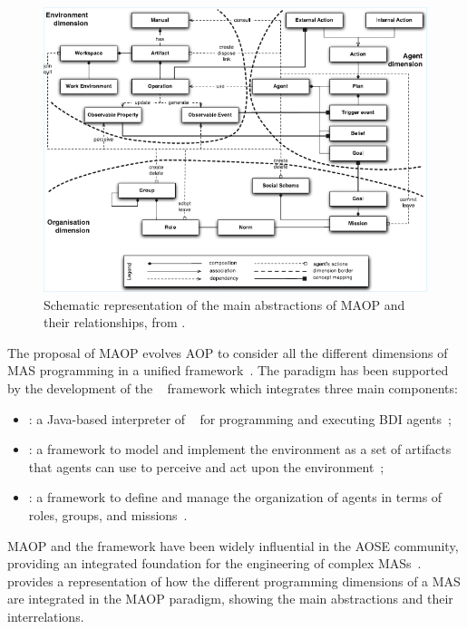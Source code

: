 \begin{figure}[t]
    \centering
    \includegraphics[width=\textwidth]{figures/mas-dimensions-schema.pdf}
    \caption{Schematic representation of the main abstractions of \ac{MAOP} and their relationships, from \cite{Boissier_Bordini_Hübner_Ricci_Santi_2013}.}
    \label{fig:mas-dimensions-schema}
\end{figure}

The proposal of \ac{MAOP} evolves \ac{AOP} to consider all the different dimensions of \ac{MAS} programming in a unified framework~\cite{Boissier_Bordini_Hübner_Ricci_Santi_2013,Boissier_Bordini_Hubner_Ricci_2020}.
%
The paradigm has been supported by the development of the \jacamo{}~\cite{Boissier_Bordini_Hubner_Ricci_2020} framework which integrates three main components:
\begin{itemize}
    \item \textbf{\jason{}}: a Java-based interpreter of \agentspeak{}~\cite{raoagentspeak} for programming and executing \ac{BDI} agents~\cite{Bordini_Hübner_Wooldridge_2007};
    \item \textbf{\cartago{}}: a framework to model and implement the environment as a set of artifacts that agents can use to perceive and act upon the environment~\cite{Ricci_Piunti_Viroli_Omicini_2009};
    \item \textbf{\moise{}}: a framework to define and manage the organization of agents in terms of roles, groups, and missions~\cite{Boissier_Hübner_Sichman_2007}.
\end{itemize}

\ac{MAOP} and the \jacamo{} framework have been widely influential in the \ac{AOSE} community, providing an integrated foundation for the engineering of complex \acp{MAS}~\cite{Boissier_Bordini_Hubner_Ricci_2020}.
%
 provides a representation of how the different programming dimensions of a \ac{MAS} are integrated in the \ac{MAOP} paradigm, showing the main abstractions and their interrelations.

